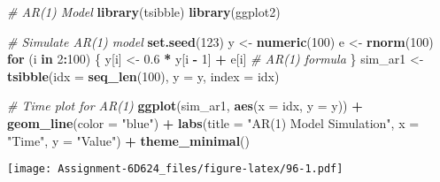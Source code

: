 \documentclass[
]{article}
\newenvironment{Shaded}{\begin{snugshade}}{\end{snugshade}}
\newcommand{\AttributeTok}[1]{\textcolor[rgb]{0.13,0.29,0.53}{#1}}
\newcommand{\CommentTok}[1]{\textcolor[rgb]{0.56,0.35,0.01}{\textit{#1}}}
\newcommand{\ControlFlowTok}[1]{\textcolor[rgb]{0.13,0.29,0.53}{\textbf{#1}}}
\newcommand{\DecValTok}[1]{\textcolor[rgb]{0.00,0.00,0.81}{#1}}
\newcommand{\FloatTok}[1]{\textcolor[rgb]{0.00,0.00,0.81}{#1}}
\newcommand{\FunctionTok}[1]{\textcolor[rgb]{0.13,0.29,0.53}{\textbf{#1}}}
\newcommand{\NormalTok}[1]{#1}
\newcommand{\OtherTok}[1]{\textcolor[rgb]{0.56,0.35,0.01}{#1}}
\newcommand{\SpecialCharTok}[1]{\textcolor[rgb]{0.81,0.36,0.00}{\textbf{#1}}}
\newcommand{\StringTok}[1]{\textcolor[rgb]{0.31,0.60,0.02}{#1}}
\begin{document}
\begin{Shaded}
\begin{Highlighting}[]
\CommentTok{\# AR(1) Model}
\FunctionTok{library}\NormalTok{(tsibble)}
\FunctionTok{library}\NormalTok{(ggplot2)}

\CommentTok{\# Simulate AR(1) model}
\FunctionTok{set.seed}\NormalTok{(}\DecValTok{123}\NormalTok{)}
\NormalTok{y }\OtherTok{\textless{}{-}} \FunctionTok{numeric}\NormalTok{(}\DecValTok{100}\NormalTok{)}
\NormalTok{e }\OtherTok{\textless{}{-}} \FunctionTok{rnorm}\NormalTok{(}\DecValTok{100}\NormalTok{)}
\ControlFlowTok{for}\NormalTok{ (i }\ControlFlowTok{in} \DecValTok{2}\SpecialCharTok{:}\DecValTok{100}\NormalTok{) \{}
\NormalTok{  y[i] }\OtherTok{\textless{}{-}} \FloatTok{0.6} \SpecialCharTok{*}\NormalTok{ y[i }\SpecialCharTok{{-}} \DecValTok{1}\NormalTok{] }\SpecialCharTok{+}\NormalTok{ e[i] }\CommentTok{\# AR(1) formula}
\NormalTok{\}}
\NormalTok{sim\_ar1 }\OtherTok{\textless{}{-}} \FunctionTok{tsibble}\NormalTok{(}\AttributeTok{idx =} \FunctionTok{seq\_len}\NormalTok{(}\DecValTok{100}\NormalTok{), }\AttributeTok{y =}\NormalTok{ y, }\AttributeTok{index =}\NormalTok{ idx)}

\CommentTok{\# Time plot for AR(1)}
\FunctionTok{ggplot}\NormalTok{(sim\_ar1, }\FunctionTok{aes}\NormalTok{(}\AttributeTok{x =}\NormalTok{ idx, }\AttributeTok{y =}\NormalTok{ y)) }\SpecialCharTok{+}
  \FunctionTok{geom\_line}\NormalTok{(}\AttributeTok{color =} \StringTok{"blue"}\NormalTok{) }\SpecialCharTok{+}
  \FunctionTok{labs}\NormalTok{(}\AttributeTok{title =} \StringTok{"AR(1) Model Simulation"}\NormalTok{, }\AttributeTok{x =} \StringTok{"Time"}\NormalTok{, }\AttributeTok{y =} \StringTok{"Value"}\NormalTok{) }\SpecialCharTok{+}
  \FunctionTok{theme\_minimal}\NormalTok{()}
\end{Highlighting}
\end{Shaded}

\texttt{[image: Assignment-6D624\_files/figure-latex/96-1.pdf]}
\end{document}
